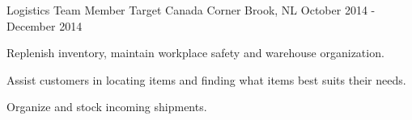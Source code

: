 \begin{cventries}
  \cventry
    {Logistics Team Member} %
    {Target Canada} %
    {Corner Brook, NL} %
    {October 2014 - December 2014} %
    {
      \begin{cvitems} %
        \item {Replenish inventory, maintain workplace safety and warehouse organization.}
        \item {Assist customers in locating items and finding what items best suits their needs.}
        \item {Organize and stock incoming shipments.}
      \end{cvitems}
    }

\end{cventries}
